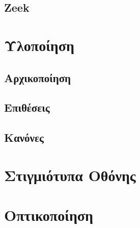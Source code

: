 \documentclass{article}
\begin{document}
\subsection{Zeek}


\newpage

\section{Υλοποίηση}
\subsection{Αρχικοποίηση}


\subsection{Επιθέσεις}


\subsection{Κανόνες}


\newpage

\section{Στιγμιότυπα Οθόνης}


\newpage

\section{Οπτικοποίηση}


\renewcommand\refname{Αναφορές}


\end{document}
